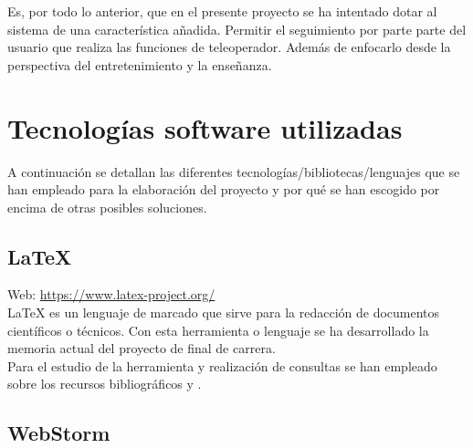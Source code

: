 Es, por todo lo anterior, que en el presente proyecto se ha intentado dotar al sistema de una característica añadida. Permitir el seguimiento por parte parte del usuario que realiza las funciones de teleoperador. Además de enfocarlo
desde la perspectiva del entretenimiento y la enseñanza.\\


\section{Tecnologías software utilizadas}

A continuación se detallan las diferentes tecnologías/bibliotecas/lenguajes que se han empleado para la elaboración del proyecto y por qué se han escogido por encima de otras posibles soluciones.

\subsection{\LaTeX}

Web: \url{https://www.latex-project.org/}\\

\LaTeX \: es un lenguaje de marcado que sirve para la redacción de documentos científicos o técnicos. Con esta herramienta o lenguaje se ha desarrollado la memoria actual del proyecto de final de carrera.\\

Para el estudio de la herramienta y realización de consultas se han empleado sobre los recursos bibliográficos \cite{book:LaTeX} y \cite{website:6}.\\


\subsection{WebStorm}


